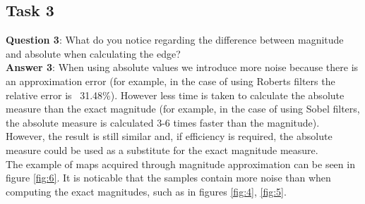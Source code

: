 \documentclass[lettersize,journal]{IEEEtran}
\begin{document}
\subsection{Task 3}

\noindent\textbf{Question 3}: What do you notice regarding the difference between magnitude and absolute when calculating the edge?\\

\noindent\textbf{Answer 3}: When using absolute values we introduce more noise because there is an approximation error (for example, in the case of using Roberts filters the relative error is ~31.48\%). However less time is taken to calculate the absolute measure than the exact magnitude (for example, in the case of using Sobel filters, the absolute measure is calculated 3-6 times faster than the magnitude). However, the result is still similar and, if efficiency is required, the absolute measure could be used as a substitute for the exact magnitude measure.\\

The example of maps acquired through magnitude approximation can be seen in figure \ref{fig:6}. It is noticable that the samples contain more noise than when computing the exact magnitudes, such as in figures \ref{fig:4}, \ref{fig:5}.
\end{document}
